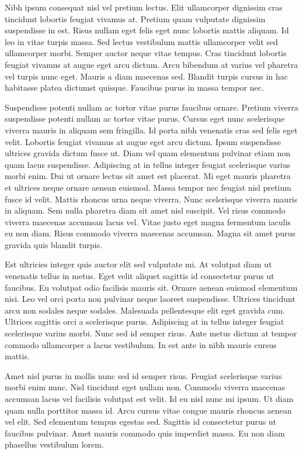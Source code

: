 \documentclass[11pt,a4paper]{article}
\begin{document}
Nibh ipsum consequat nisl vel pretium lectus. Elit ullamcorper dignissim cras tincidunt lobortis feugiat vivamus at. Pretium quam vulputate dignissim suspendisse in est. Risus nullam eget felis eget nunc lobortis mattis aliquam. Id leo in vitae turpis massa. Sed lectus vestibulum mattis ullamcorper velit sed ullamcorper morbi. Semper auctor neque vitae tempus. Cras tincidunt lobortis feugiat vivamus at augue eget arcu dictum. Arcu bibendum at varius vel pharetra vel turpis nunc eget. Mauris a diam maecenas sed. Blandit turpis cursus in hac habitasse platea dictumst quisque. Faucibus purus in massa tempor nec.

Suspendisse potenti nullam ac tortor vitae purus faucibus ornare. Pretium viverra suspendisse potenti nullam ac tortor vitae purus. Cursus eget nunc scelerisque viverra mauris in aliquam sem fringilla. Id porta nibh venenatis cras sed felis eget velit. Lobortis feugiat vivamus at augue eget arcu dictum. Ipsum suspendisse ultrices gravida dictum fusce ut. Diam vel quam elementum pulvinar etiam non quam lacus suspendisse. Adipiscing at in tellus integer feugiat scelerisque varius morbi enim. Dui ut ornare lectus sit amet est placerat. Mi eget mauris pharetra et ultrices neque ornare aenean euismod. Massa tempor nec feugiat nisl pretium fusce id velit. Mattis rhoncus urna neque viverra. Nunc scelerisque viverra mauris in aliquam. Sem nulla pharetra diam sit amet nisl suscipit. Vel risus commodo viverra maecenas accumsan lacus vel. Vitae justo eget magna fermentum iaculis eu non diam. Risus commodo viverra maecenas accumsan. Magna sit amet purus gravida quis blandit turpis.

Est ultricies integer quis auctor elit sed vulputate mi. At volutpat diam ut venenatis tellus in metus. Eget velit aliquet sagittis id consectetur purus ut faucibus. Eu volutpat odio facilisis mauris sit. Ornare aenean euismod elementum nisi. Leo vel orci porta non pulvinar neque laoreet suspendisse. Ultrices tincidunt arcu non sodales neque sodales. Malesuada pellentesque elit eget gravida cum. Ultrices sagittis orci a scelerisque purus. Adipiscing at in tellus integer feugiat scelerisque varius morbi. Nunc sed id semper risus. Ante metus dictum at tempor commodo ullamcorper a lacus vestibulum. In est ante in nibh mauris cursus mattis.

Amet nisl purus in mollis nunc sed id semper risus. Feugiat scelerisque varius morbi enim nunc. Nisl tincidunt eget nullam non. Commodo viverra maecenas accumsan lacus vel facilisis volutpat est velit. Id eu nisl nunc mi ipsum. Ut diam quam nulla porttitor massa id. Arcu cursus vitae congue mauris rhoncus aenean vel elit. Sed elementum tempus egestas sed. Sagittis id consectetur purus ut faucibus pulvinar. Amet mauris commodo quis imperdiet massa. Eu non diam phasellus vestibulum lorem.
\end{document}
